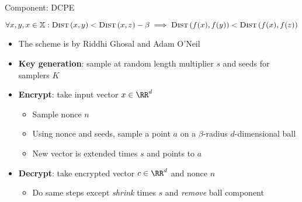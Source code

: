 	\begin{frame}{Component: DCPE}

		\[
			\forall x, y, x \in \mathbb{X} : \algo{Dist}{x, y} < \algo{Dist}{x, z} - \beta \implies \algo{Dist}{f(x), f(y)} < \algo{Dist}{f(x), f(z)}
		\]

		\begin{itemize}
			\item<1->
				The scheme is by Riddhi Ghosal and Adam O'Neil
			\item<2->
				\textbf{Key generation}: sample at random length multiplier $s$ and seeds for samplers $K$
			\item<3->
				\textbf{Encrypt}: take input vector $x \in \RR^d$
				\begin{itemize}
					\item Sample nonce $n$
					\item Using nonce and seeds, sample a point $a$ on a $\beta$-radius $d$-dimensional ball
					\item New vector is extended times $s$ and points to $a$
				\end{itemize}
			\item<4->
				\textbf{Decrypt}: take encrypted vector $c \in \RR^d$ and nonce $n$
				\begin{itemize}
					\item Do same steps except \emph{shrink} times $s$ and \emph{remove} ball component
				\end{itemize}
		\end{itemize}

	\end{frame}


